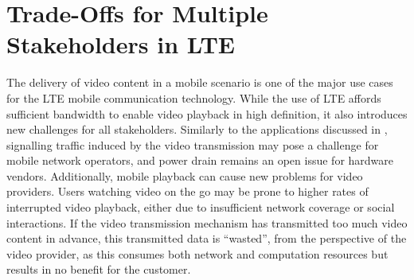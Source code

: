 \section{Trade-Offs for Multiple Stakeholders in LTE}\label{sec:application:lte_video}

\newcommand{\bandwidth}{\ensuremath{b_W}\xspace}
\newcommand{\bitrate}{\ensuremath{b_R}\xspace}
\newcommand{\timeplayedback}{\ensuremath{t_p}}

\newcommand{\streamingstart}{\ensuremath{\sigma}\xspace}
\newcommand{\bufferlower}{\ensuremath{\theta}\xspace}
\newcommand{\buffersize}{\ensuremath{\Theta}\xspace}

\newcommand{\ton}{\(T_{\texttt{ON}}\)\xspace}
\newcommand{\tdrxinactivity}{\(T_{\texttt{I}}\)\xspace}

\newcommand{\shortdrx}{\texttt{Short} \texttt{DRX}\xspace}
\newcommand{\tshortdrx}{\(T_{\texttt{S}}\)\xspace}
\newcommand{\longdrx}{\texttt{Long} \texttt{DRX}\xspace}
\newcommand{\tlongdrx}{\(T_{\texttt{L}}\)\xspace}
\newcommand{\rrcconnected}{\texttt{RRC\_Connected}\xspace}
\newcommand{\tidle}{\(T_{\texttt{Idle}}\)\xspace}
\newcommand{\tonidle}{\(T^{\texttt{Idle}}_{\texttt{ON}}\)\xspace}
\newcommand{\rrcidle}{\texttt{RRC\_Idle}\xspace}
\newcommand{\tdrxidle}{\(T^{\texttt{Idle}}_{\texttt{\gls{DRX}}}\)\xspace}
\newcommand{\promotiondelay}{\(D_P\)\xspace}

\newcommand{\bandwidthdown}{b_d\xspace}
\newcommand{\timedownloaded}{\ensuremath{t_d}}

\newcommand{\power}{P\xspace}
\newcommand{\energyconsumption}{\ensuremath{E}\xspace}
\newcommand{\connectioncount}{\ensuremath{C}\xspace}

\newcommand{\factordown}{\ensuremath{\alpha}\xspace}
\newcommand{\powerbaseline}{\ensuremath{\beta}\xspace}

\newcommand{\userabortrv}{\ensuremath{A}\xspace}
\newcommand{\userabortpdf}{\ensuremath{a}\xspace}
\newcommand{\meanwastedtraffic}{\ensuremath{W}\xspace}

\newcommand{\timeunwatched}{\ensuremath{t_u}}
\newcommand{\videolength}{l\xspace}

The delivery of video content in a mobile scenario is one of the major use cases for the \gls{LTE} mobile communication technology.
While the use of \gls{LTE} affords sufficient bandwidth to enable video playback in high definition, it also introduces new challenges for all stakeholders.
Similarly to the applications discussed in , signalling traffic induced by the video transmission may pose a challenge for mobile network operators, and power drain remains an open issue for hardware vendors.
Additionally, mobile playback can cause new problems for video providers.
Users watching video on the go may be prone to higher rates of interrupted video playback, either due to insufficient network coverage or social interactions.
If the video transmission mechanism has transmitted too much video content in advance, this transmitted data is ``wasted'', from the perspective of the video provider, as this consumes both network and computation resources but results in no benefit for the customer.


